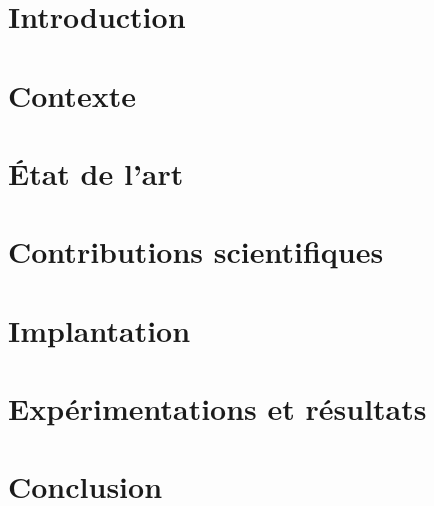 \documentclass[final,12pt,doubleside]{book}
\begin{document}
	\dominitoc
	\frontmatter
\completetable
	
\mainmatter

\chapter{Introduction}
\chaptertable

\chapter{Contexte}
\chaptertable

\chapter{État de l'art}
\chaptertable

\chapter{Contributions scientifiques}
\chaptertable

\chapter{Implantation}
\chaptertable

\chapter{Expérimentations et résultats}
\chaptertable

\chapter{Conclusion}
\chaptertable

\end{document}
